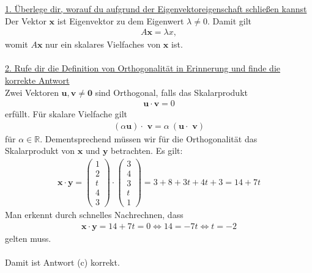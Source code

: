 \underline{1. Überlege dir, worauf du aufgrund der Eigenvektoreigenschaft schließen kannst}\\
Der Vektor $\textbf{x}$ ist Eigenvektor zu dem Eigenwert $\lambda \neq 0$.
Damit gilt
\begin{align*}
A \textbf{x} = \lambda x,
\end{align*}
womit $A \textbf{x}$ nur ein skalares Vielfaches von $\textbf{x}$ ist.\\
\\
\underline{2. Rufe dir die Definition von Orthogonalität in Erinnerung und finde die korrekte Antwort}\\
Zwei Vektoren $\textbf{u}, \textbf{v} \neq \textbf{0}$
sind Orthogonal, falls das Skalarprodukt
\begin{align*}
\textbf{u} \cdot \textbf{v} = 0 
\end{align*}
erfüllt.
Für skalare Vielfache gilt 
\begin{align*}
(\alpha \textbf{u}) \cdot \textbf{ v} 
= 
\alpha \ (\textbf{u} \cdot \textbf{ v} )
\end{align*}
für $\alpha \in \mathbb{R}$.
Dementsprechend müssen wir für die Orthogonalität das Skalarprodukt von $\textbf{x}$ und $\textbf{y}$  betrachten.
Es gilt:
\begin{align*}
\textbf{x} \cdot \textbf{y} 
= 
\begin{pmatrix}
1\\
2\\
t\\
4\\
3
\end{pmatrix}
\cdot 
\begin{pmatrix}
3\\
4\\
3\\
t\\ 
1
\end{pmatrix}
= 3 + 8 + 3t + 4t + 3 
=14 + 7t 
\end{align*}
Man erkennt durch schnelles Nachrechnen, dass
\begin{align*}
\textbf{x} \cdot \textbf{y} 
=14 + 7t 
= 0
\Leftrightarrow
14 = -7t
\Leftrightarrow
t = -2
\end{align*}
gelten muss.\\
\\
Damit ist Antwort (c) korrekt.

\newpage
